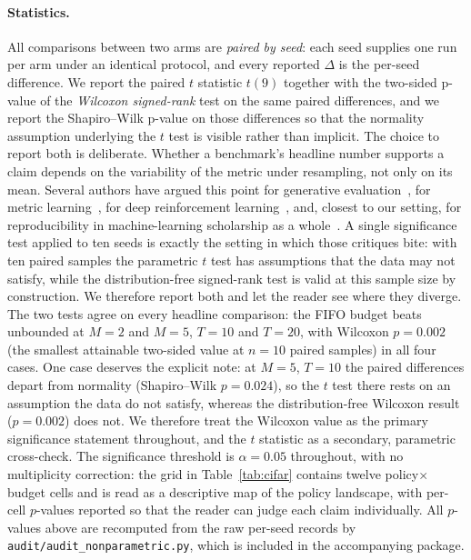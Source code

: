 \documentclass[review,12pt,number]{elsarticle}
\begin{document}
\paragraph{Statistics.}
All comparisons between two arms are \emph{paired by seed}: each seed
supplies one run per arm under an identical protocol, and every reported
$\Delta$ is the per-seed difference. We report the paired $t$ statistic
$t(9)$ together with the two-sided p-value of the \emph{Wilcoxon
signed-rank} test on the same paired differences, and we report the
Shapiro--Wilk p-value on those differences so that the normality
assumption underlying the $t$ test is visible rather than implicit.
The choice to report both is deliberate. Whether a benchmark's headline
number supports a claim depends on the variability of the metric under
resampling, not only on its mean. Several authors have argued this point
for generative evaluation~\cite{lucic2018,melis2018}, for metric
learning~\cite{musgrave2020}, for deep reinforcement
learning~\cite{agarwal2021}, and, closest to our setting, for
reproducibility in machine-learning scholarship as a
whole~\cite{lipton2019}. A single significance test applied to ten
seeds is exactly the setting in which those critiques bite: with ten
paired samples the parametric $t$ test has assumptions that the data
may not satisfy, while the distribution-free signed-rank test is
valid at this sample size by construction. We therefore report both
and let the reader see where they diverge.
The two tests agree on every headline comparison: the FIFO budget beats
unbounded at $M{=}2$ and $M{=}5$, $T{=}10$ and $T{=}20$, with
Wilcoxon $p{=}0.002$ (the smallest attainable two-sided value at
$n{=}10$ paired samples) in all four cases. One case deserves the
explicit note: at $M{=}5$, $T{=}10$ the paired differences depart
from normality (Shapiro--Wilk $p{=}0.024$), so the $t$ test there
rests on an assumption the data do not satisfy, whereas the
distribution-free Wilcoxon result ($p{=}0.002$) does not. We therefore
treat the Wilcoxon value as the primary significance statement
throughout, and the $t$ statistic as a secondary, parametric
cross-check. The significance threshold is $\alpha{=}0.05$ throughout,
with no multiplicity correction: the grid in Table~\ref{tab:cifar}
contains twelve policy$\times$budget cells and is read as a
descriptive map of the policy landscape, with per-cell $p$-values
reported so that the reader can judge each claim individually. All
$p$-values above are recomputed from the raw per-seed records by
\texttt{audit/audit\_nonparametric.py}, which is included in the accompanying
package.
\end{document}
